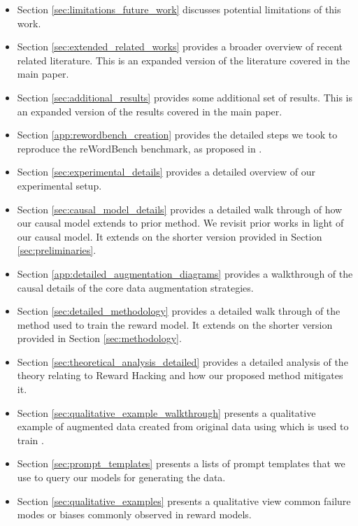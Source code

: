 \documentclass[11pt, letterpaper, logo, copyright]{googledeepmind}
\begin{document}
\begin{itemize}[leftmargin=1em]
    \item Section \ref{sec:limitations_future_work} discusses potential limitations of this work.

    \item Section \ref{sec:extended_related_works} provides a broader overview of recent related literature. This is an expanded version of the literature covered in the main paper.
    
    \item Section \ref{sec:additional_results} provides some additional set of results. This is an expanded version of the results covered in the main paper.
    
    \item Section \ref{app:rewordbench_creation} provides the detailed steps we took to reproduce the reWordBench benchmark, as proposed in \citet{wu2025rewordbench}.

    \item Section \ref{sec:experimental_details} provides a detailed overview of our experimental setup.

    \item Section \ref{sec:causal_model_details} provides a detailed walk through of how our causal model extends to prior method. We revisit prior works in light of our causal model. It extends on the shorter version provided in Section \ref{sec:preliminaries}.

    \item Section \ref{app:detailed_augmentation_diagrams} provides a walkthrough of the causal details of the core data augmentation strategies.
    
    \item Section \ref{sec:detailed_methodology} provides a detailed walk through of the method used to train the reward model. It extends on the shorter version provided in Section \ref{sec:methodology}.

    \item Section \ref{sec:theoretical_analysis_detailed} provides a detailed analysis of the theory relating to Reward Hacking and how our proposed method mitigates it.
    
    \item Section \ref{sec:qualitative_example_walkthrough} presents a qualitative example of augmented data created from original data using which is used to train \carma{}.
    
    \item Section \ref{sec:prompt_templates} presents a lists of prompt templates that we use to query our models for generating the data.
    
    \item Section \ref{sec:qualitative_examples} presents a qualitative view common failure modes or biases commonly observed in reward models.
  
\end{itemize}
\end{document}
